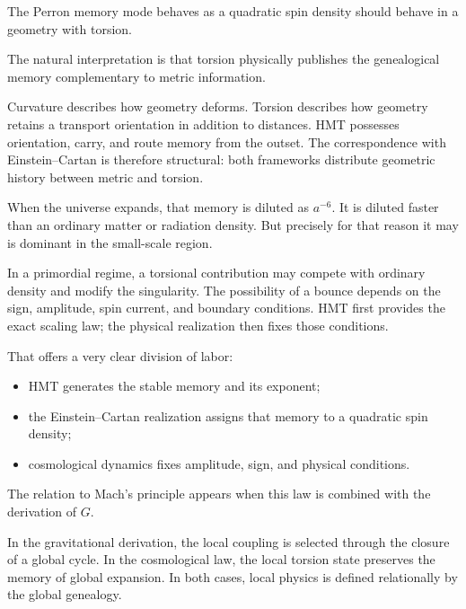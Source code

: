 The Perron memory mode behaves as a quadratic spin density should behave in a geometry with torsion.\par

The natural interpretation is that torsion physically publishes the genealogical memory complementary to metric information.\par

Curvature describes how geometry deforms. Torsion describes how geometry retains a transport orientation in addition to distances. HMT possesses orientation, carry, and route memory from the outset. The correspondence with Einstein–Cartan is therefore structural: both frameworks distribute geometric history between metric and torsion.\par

When the universe expands, that memory is diluted as \(a^{-6}\). It is diluted faster than an ordinary matter or radiation density. But precisely for that reason it may is dominant in the small-scale region.\par

In a primordial regime, a torsional contribution may compete with ordinary density and modify the singularity. The possibility of a bounce depends on the sign, amplitude, spin current, and boundary conditions. HMT first provides the exact scaling law; the physical realization then fixes those conditions.\par

That offers a very clear division of labor:\par

\begin{itemize}[leftmargin=*,itemsep=0.35em]
\item HMT generates the stable memory and its exponent;
\item the Einstein–Cartan realization assigns that memory to a quadratic spin density;
\item cosmological dynamics fixes amplitude, sign, and physical conditions.
\end{itemize}

The relation to Mach's principle appears when this law is combined with the derivation of \(G\).\par

In the gravitational derivation, the local coupling is selected through the closure of a global cycle. In the cosmological law, the local torsion state preserves the memory of global expansion. In both cases, local physics is defined relationally by the global genealogy.\par

